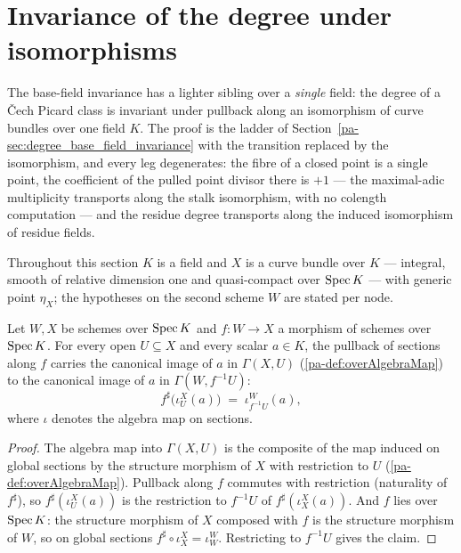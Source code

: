 \section{Invariance of the degree under isomorphisms}
\label{pa-sec:degree_iso_invariance}

The base-field invariance has a lighter sibling over a \emph{single} field: the degree
of a \v Cech Picard class is invariant under pullback along an isomorphism of curve
bundles over one field \(K\). The proof is the ladder of
Section~\ref{pa-sec:degree_base_field_invariance} with the transition replaced by the
isomorphism, and every leg degenerates: the fibre of a closed point is a single point,
the coefficient of the pulled point divisor there is \(+1\) --- the maximal-adic
multiplicity transports along the stalk isomorphism, with no colength computation ---
and the residue degree transports along the induced isomorphism of residue fields.

Throughout this section \(K\) is a field and \(X\) is a curve bundle over \(K\) ---
integral, smooth of relative dimension one and quasi-compact over \(\operatorname{Spec} K\) --- with
generic point \(\eta_X\); the hypotheses on the second scheme \(W\) are stated per
node.

\begin{lemma}
  \label{pa-lem:overAlgebraMap_app}
  \leanok

  Let \(W, X\) be schemes over \(\operatorname{Spec} K\) and \(f : W \to X\) a morphism of schemes
  over \(\operatorname{Spec} K\). For every open \(U \subseteq X\) and every scalar \(a \in K\), the
  pullback of sections along \(f\) carries the canonical image of \(a\) in
  \(\Gamma(X, U)\) (\ref{pa-def:overAlgebraMap}) to the canonical image of \(a\) in
  \(\Gamma(W, f^{-1}U)\):
  \[
    f^{\sharp}\bigl(\iota^{X}_{U}(a)\bigr) \;=\; \iota^{W}_{f^{-1}U}(a),
  \]
  where \(\iota\) denotes the algebra map on sections.
\end{lemma}
\begin{proof}
  \leanok
  The algebra map into \(\Gamma(X, U)\) is the composite of the map induced on global
  sections by the structure morphism of \(X\) with restriction to \(U\)
  (\ref{pa-def:overAlgebraMap}). Pullback along \(f\) commutes with restriction
  (naturality of \(f^{\sharp}\)), so \(f^{\sharp}(\iota^{X}_{U}(a))\) is the
  restriction to \(f^{-1}U\) of \(f^{\sharp}(\iota^{X}_{X}(a))\). And \(f\) lies over
  \(\operatorname{Spec} K\): the structure morphism of \(X\) composed with \(f\) is the structure
  morphism of \(W\), so on global sections \(f^{\sharp} \circ \iota^{X}_{X} =
  \iota^{W}_{W}\). Restricting to \(f^{-1}U\) gives the claim.
\end{proof}


